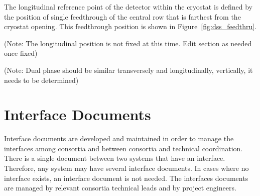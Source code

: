 The longitudinal reference point of the detector within the cryostat
is defined by the position of single feedthrough of the central row
that is farthest from the cryostat opening. This feedthrough position
is shown in Figure~\ref{fig:dss_feedthru}.




(Note: The longitudinal position is not fixed at this time. Edit
section as needed once fixed)


(Note: Dual phase should be similar
transversely and longitudinally, vertically, it needs to be
determined)




\section{Interface Documents}
\label{sec:fdsp-coord-integ-interface}


Interface documents are developed and maintained in order to manage
the interfaces among consortia and between consortia and technical
coordination. There is a single document between two systems that have
an interface. Therefore, any system may have several interface
documents. In cases where no interface exists, an interface document
is not needed. The interfaces documents are managed by relevant
consortia technical leads and by  project engineers.


